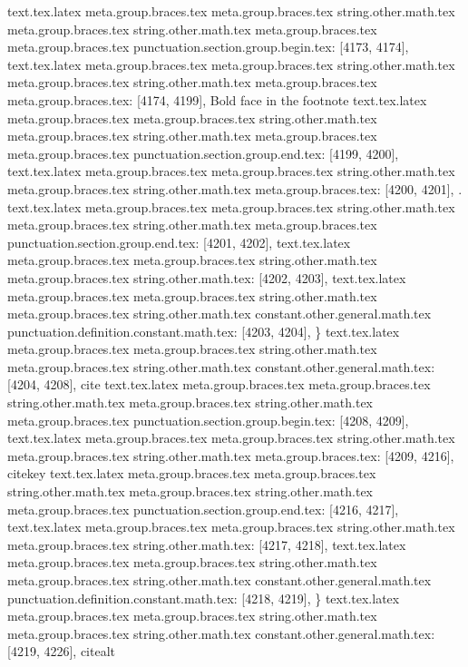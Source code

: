 {{{{{{{{{{{{{{{{{{{{{{{{{{{{{{{{{{{{{{{{{{{{{{{{{{{{{{{{{{{{{{{{{{{{{{{{{{{{{{{{{{{{{{{{{{{{{{{{{{{{{{{{{{{{{{{{{{{{{{{{{{{{{{{{{{{{{text.tex.latex meta.group.braces.tex meta.group.braces.tex string.other.math.tex meta.group.braces.tex string.other.math.tex meta.group.braces.tex meta.group.braces.tex punctuation.section.group.begin.tex: [4173, 4174], {{}
text.tex.latex meta.group.braces.tex meta.group.braces.tex string.other.math.tex meta.group.braces.tex string.other.math.tex meta.group.braces.tex meta.group.braces.tex: [4174, 4199], {Bold face in the footnote}
text.tex.latex meta.group.braces.tex meta.group.braces.tex string.other.math.tex meta.group.braces.tex string.other.math.tex meta.group.braces.tex meta.group.braces.tex punctuation.section.group.end.tex: [4199, 4200], {}}
text.tex.latex meta.group.braces.tex meta.group.braces.tex string.other.math.tex meta.group.braces.tex string.other.math.tex meta.group.braces.tex: [4200, 4201], {.}
text.tex.latex meta.group.braces.tex meta.group.braces.tex string.other.math.tex meta.group.braces.tex string.other.math.tex meta.group.braces.tex punctuation.section.group.end.tex: [4201, 4202], {}}
text.tex.latex meta.group.braces.tex meta.group.braces.tex string.other.math.tex meta.group.braces.tex string.other.math.tex: [4202, 4203], {
}
text.tex.latex meta.group.braces.tex meta.group.braces.tex string.other.math.tex meta.group.braces.tex string.other.math.tex constant.other.general.math.tex punctuation.definition.constant.math.tex: [4203, 4204], {\}
text.tex.latex meta.group.braces.tex meta.group.braces.tex string.other.math.tex meta.group.braces.tex string.other.math.tex constant.other.general.math.tex: [4204, 4208], {cite}
text.tex.latex meta.group.braces.tex meta.group.braces.tex string.other.math.tex meta.group.braces.tex string.other.math.tex meta.group.braces.tex punctuation.section.group.begin.tex: [4208, 4209], {{}
text.tex.latex meta.group.braces.tex meta.group.braces.tex string.other.math.tex meta.group.braces.tex string.other.math.tex meta.group.braces.tex: [4209, 4216], {citekey}
text.tex.latex meta.group.braces.tex meta.group.braces.tex string.other.math.tex meta.group.braces.tex string.other.math.tex meta.group.braces.tex punctuation.section.group.end.tex: [4216, 4217], {}}
text.tex.latex meta.group.braces.tex meta.group.braces.tex string.other.math.tex meta.group.braces.tex string.other.math.tex: [4217, 4218], {
}
text.tex.latex meta.group.braces.tex meta.group.braces.tex string.other.math.tex meta.group.braces.tex string.other.math.tex constant.other.general.math.tex punctuation.definition.constant.math.tex: [4218, 4219], {\}
text.tex.latex meta.group.braces.tex meta.group.braces.tex string.other.math.tex meta.group.braces.tex string.other.math.tex constant.other.general.math.tex: [4219, 4226], {citealt}
}}}}}}}}}}}}}}}}}}}}}}}}}}}}}}}}}}}}}}}}}}}}}}}}}}}}}}}}}}}}}}}}}}}}}}}}}}}}}}}}}}}}}}}}}}}}}}}}}}}}}}}}}}}}}}}}}}}}}}}}}}}}}}}}}}}}}}
